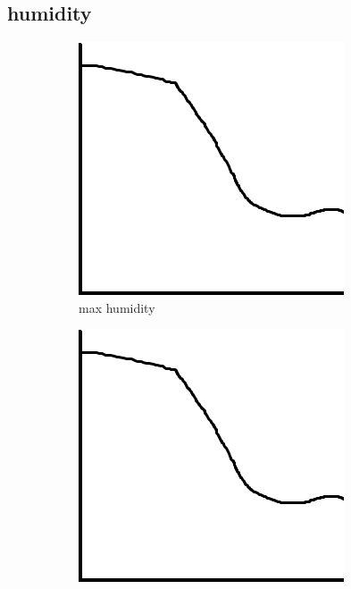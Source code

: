 \subsection{humidity} 
\begin{figure}[hbt!] 
\begin{subfigure}{0.3\textwidth} 
\includegraphics[width=0.9\linewidth]{reports/current_report/images/max_graph_humidity.png}  
\caption{max humidity}  
\end{subfigure} 
\begin{subfigure}{0.3\textwidth} 
\includegraphics[width=0.9\linewidth]{reports/current_report/images/min_graph_humidity.png}  

\end{subfigure}
\end{figure}
